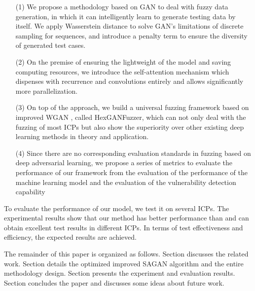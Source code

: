\begin{itemize}
\item[(1)] We propose a methodology based on GAN to deal with fuzzy data generation, in which it can intelligently learn to generate testing data by itself. We apply Wasserstein distance\cite{arjovsky2017wasserstein}  to solve GAN's limitations of discrete sampling for sequences, and introduce a penalty term to ensure the diversity of generated test cases.
\item[(2)] On the premise of ensuring the lightweight of the model and saving computing resources, we introduce the self-attention mechanism which dispenses with recurrence and convolutions entirely and allows significantly more parallelization. %
\item[(3)] On top of the approach, we build a universal fuzzing framework based on improved WGAN \cite{arjovsky2017wasserstein}, called HexGANFuzzer, which can not only deal with the fuzzing of most ICPs but also show the superiority over other existing deep learning methods in theory and application. %
\item[(4)] Since there are no corresponding evaluation standards in fuzzing based on deep adversarial learning, we propose a series of metrics to evaluate the performance of our framework from the evaluation of the performance of the machine learning model and the evaluation of the vulnerability detection capability
\end{itemize}

To evaluate the performance of our model, we test it on several ICPs. The experimental results show that our method has better performance than and can obtain excellent test results in different ICPs. In terms of test effectiveness and efficiency, the expected results are achieved.

The remainder of this paper is organized as follows. Section \uppercase\expandafter{} discusses the related work. Section \uppercase\expandafter{} details the optimized improved SAGAN algorithm and the entire methodology design. Section \uppercase\expandafter{} presents the experiment and evaluation results. Section \uppercase\expandafter{} concludes the paper and discusses some ideas about future work.
